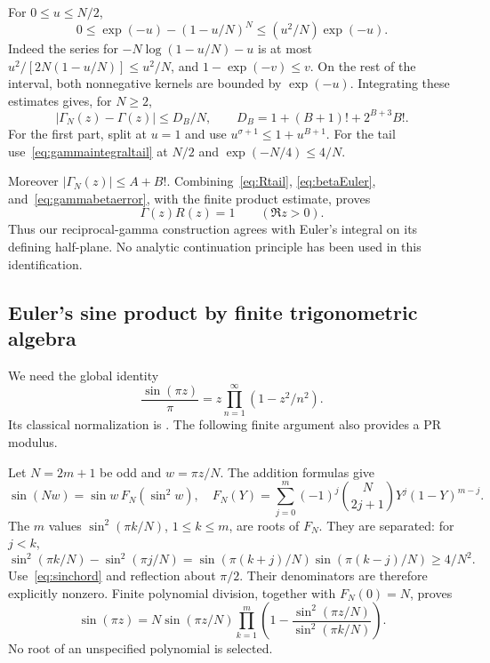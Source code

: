 \documentclass[11pt,letterpaper]{article}
\numberwithin{equation}{section}
\theoremstyle{definition}
\newcommand{\gamrec}{R}
\begin{document}
For \(0\le u\le N/2\),
\begin{equation}
 0\le \exp(-u)-(1-u/N)^N
                  \le (u^2/N)\exp(-u).                   \label{eq:betakernel}
\end{equation}
Indeed the series for \(-N\log(1-u/N)-u\) is at most
\(u^2/[2N(1-u/N)]\le u^2/N\), and
\(1-\exp(-v)\le v\). On the rest of the interval, both nonnegative
kernels are bounded by \(\exp(-u)\).
Integrating these estimates gives, for \(N\ge2\),
\begin{equation}
 |\Gamma_N(z)-\Gamma(z)|\le D_B/N,\qquad
 D_B=1+(B+1)!+2^{B+3}B!.                                 \label{eq:gammabetaerror}
\end{equation}
For the first part, split at \(u=1\) and use
\(u^{\sigma+1}\le1+u^{B+1}\).
For the tail use~\eqref{eq:gammaintegraltail} at \(N/2\)
and \(\exp(-N/4)\le4/N\).

Moreover \(|\Gamma_N(z)|\le A+B!\).
Combining~\eqref{eq:Rtail}, \eqref{eq:betaEuler},
and~\eqref{eq:gammabetaerror}, with the finite product estimate,
proves
\begin{equation}
                 \Gamma(z)\gamrec(z)=1\qquad(\Re z>0).
                 \label{eq:gammaReciprocal}
\end{equation}
Thus our reciprocal-gamma construction agrees with Euler's integral
on its defining half-plane. No analytic continuation principle has
been used in this identification.

\subsection{Euler's sine product by finite trigonometric algebra}

We need the global identity
\begin{equation}
 \frac{\sin(\pi z)}{\pi}
       =z\prod_{n=1}^\infty(1-z^2/n^2).                  \label{eq:sineproduct}
\end{equation}
Its classical normalization is \cite{DLMF422}. The following finite
argument also provides a PR modulus.

Let \(N=2m+1\) be odd and \(w=\pi z/N\).
The addition formulas give
\[
 \sin(Nw)=\sin w\,F_N(\sin^2w),\quad
 F_N(Y)=\sum_{j=0}^m(-1)^j\binom N{2j+1}Y^j(1-Y)^{m-j}.
\]
The \(m\) values \(\sin^2(\pi k/N)\), \(1\le k\le m\), are
roots of \(F_N\). They are separated: for \(j<k\),
\[
 \sin^2(\pi k/N)-\sin^2(\pi j/N)
  =\sin(\pi(k+j)/N)\sin(\pi(k-j)/N)\ge4/N^2.
\]
Use~\eqref{eq:sinchord} and reflection about \(\pi/2\).
Their denominators are therefore explicitly nonzero.
Finite polynomial division, together with \(F_N(0)=N\), proves
\begin{equation}
 \sin(\pi z)=N\sin(\pi z/N)
   \prod_{k=1}^m
   \left(1-\frac{\sin^2(\pi z/N)}{\sin^2(\pi k/N)}\right).
 \label{eq:finitesine}
\end{equation}
No root of an unspecified polynomial is selected.
\end{document}
